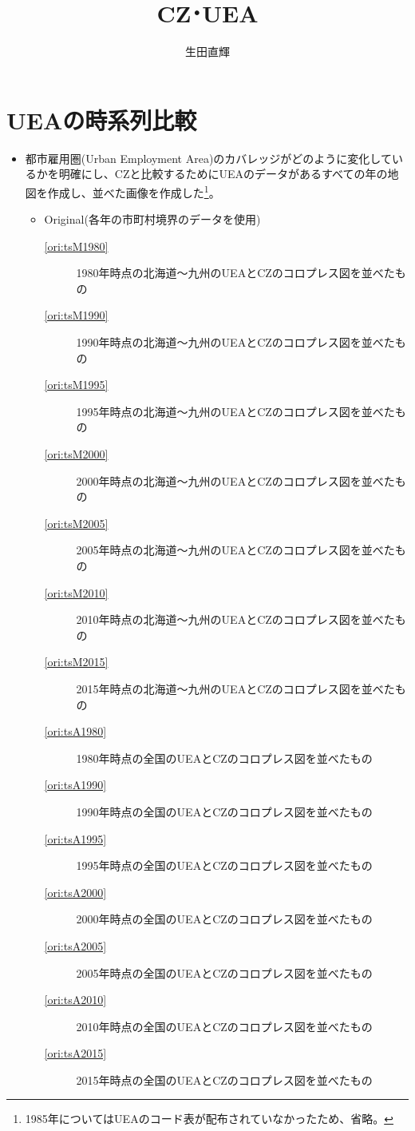 \documentclass{ltjsarticle}
\title{CZ･UEA}
\author{生田直輝}
\begin{document}
\maketitle
\section{UEAの時系列比較}
\begin{itemize}
  \item 都市雇用圏(Urban Employment Area)のカバレッジがどのように変化しているかを明確にし、CZと比較するためにUEAのデータがあるすべての年の地図を作成し、並べた画像を作成した\footnote{1985年についてはUEAのコード表が配布されていなかったため、省略。}。
  \begin{itemize}
    \item Original(各年の市町村境界のデータを使用)
    \begin{description}
      \item[\ref{ori:tsM1980}] 1980年時点の北海道～九州のUEAとCZのコロプレス図を並べたもの
      \item[\ref{ori:tsM1990}] 1990年時点の北海道～九州のUEAとCZのコロプレス図を並べたもの
      \item[\ref{ori:tsM1995}] 1995年時点の北海道～九州のUEAとCZのコロプレス図を並べたもの
      \item[\ref{ori:tsM2000}] 2000年時点の北海道～九州のUEAとCZのコロプレス図を並べたもの
      \item[\ref{ori:tsM2005}] 2005年時点の北海道～九州のUEAとCZのコロプレス図を並べたもの
      \item[\ref{ori:tsM2010}] 2010年時点の北海道～九州のUEAとCZのコロプレス図を並べたもの
      \item[\ref{ori:tsM2015}] 2015年時点の北海道～九州のUEAとCZのコロプレス図を並べたもの
      \item[\ref{ori:tsA1980}] 1980年時点の全国のUEAとCZのコロプレス図を並べたもの
      \item[\ref{ori:tsA1990}] 1990年時点の全国のUEAとCZのコロプレス図を並べたもの
      \item[\ref{ori:tsA1995}] 1995年時点の全国のUEAとCZのコロプレス図を並べたもの
      \item[\ref{ori:tsA2000}] 2000年時点の全国のUEAとCZのコロプレス図を並べたもの
      \item[\ref{ori:tsA2005}] 2005年時点の全国のUEAとCZのコロプレス図を並べたもの
      \item[\ref{ori:tsA2010}] 2010年時点の全国のUEAとCZのコロプレス図を並べたもの
      \item[\ref{ori:tsA2015}] 2015年時点の全国のUEAとCZのコロプレス図を並べたもの

\end{description}
\end{itemize}
\end{itemize}
\end{document}
